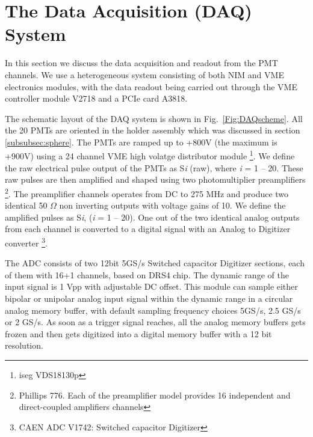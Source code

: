 \section{The Data Acquisition (DAQ) System }
\label{sec:DAQ}

{}

In this section we discuss the data acquisition and readout from the PMT 
channels. We use a heterogeneous system consisting of both 
NIM and VME electronics modules, with the data readout being carried out through 
the VME controller module V2718 and a PCIe card A3818. 

The schematic layout 
of the DAQ system is shown in Fig.~{\ref{Fig:DAQscheme}}. All the 20 PMTs 
are oriented in the holder assembly which was discussed in section \ref{subsubsec:sphere}. 
The PMTs are ramped up to +800V (the maximum is +900V) using a 24 channel 
VME high volatge distributor module \footnote{iseg VDS18130p}.  
We define the raw electrical pulse output of the PMTs as S{\it i} (raw), where {\it i} = 1 -- 20. 
These raw pulses are then 
amplified and shaped using two photomultiplier preamplifiers \footnote{Phillips 776. 
Each of the preamplifier model provides 16 independent  and direct-coupled 
amplifiers channels}. The preamplifier channels operates from DC to 275 MHz and 
produce two identical 50 $\Omega$ non inverting outputs with voltage gains of 10. 
We define the amplified pulses as S{\it i}, ({\it i} = 1 -- 20). One out of the 
two identical analog outputs from each channel is converted to a digital 
signal with an Analog to Digitizer converter \footnote{CAEN ADC V1742: Switched capacitor Digitizer}. 

The ADC consists of two 12bit 5GS/s Switched capacitor Digitizer sections, 
each of them with 16+1 channels, based on DRS4 chip. The dynamic range of the input 
signal is 1 Vpp with adjustable DC offset. This module can sample either bipolar or 
unipolar analog input signal within the dynamic range in a circular 
analog memory buffer, with default sampling frequency choices 5GS/s, 2.5 GS/s 
or 2 GS/s. As soon as a trigger signal reaches, all the analog memory 
buffers gets frozen and then gets digitized into a digital memory buffer 
with a 12 bit resolution. 

